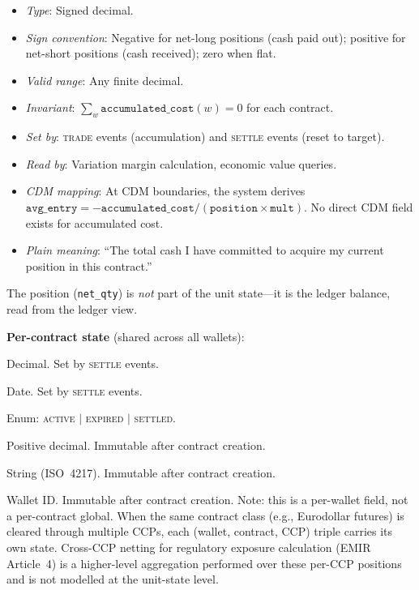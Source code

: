 \documentclass[11pt,a4paper]{article}
\begin{document}
\begin{description}[style=nextline,nosep]
\item[\texttt{accumulated\_cost}] \hfill
  \begin{itemize}[nosep]
  \item \emph{Type}: Signed decimal.
  \item \emph{Sign convention}: Negative for net-long positions (cash paid out); positive for net-short positions (cash received); zero when flat.
  \item \emph{Valid range}: Any finite decimal.
  \item \emph{Invariant}: $\sum_w \texttt{accumulated\_cost}(w) = 0$ for each contract.
  \item \emph{Set by}: \textsc{trade} events (accumulation) and \textsc{settle} events (reset to target).
  \item \emph{Read by}: Variation margin calculation, economic value queries.
  \item \emph{CDM mapping}: At CDM boundaries, the system derives $\texttt{avg\_entry} = -\texttt{accumulated\_cost} / (\texttt{position} \times \texttt{mult})$.  No direct CDM field exists for accumulated cost.
  \item \emph{Plain meaning}: ``The total cash I have committed to acquire my current position in this contract.''
  \end{itemize}
\end{description}

\noindent The position (\texttt{net\_qty}) is \emph{not} part of the unit state---it is the ledger balance, read from the ledger view.

\medskip
\noindent\textbf{Per-contract state} (shared across all wallets):

\begin{description}[style=nextline,nosep]
\item[\texttt{last\_settlement\_price}] Decimal.  Set by \textsc{settle} events.
\item[\texttt{last\_settlement\_date}] Date.  Set by \textsc{settle} events.
\item[\texttt{lifecycle\_stage}] Enum: \textsc{active} $|$ \textsc{expired} $|$ \textsc{settled}.
\item[\texttt{multiplier}] Positive decimal.  Immutable after contract creation.
\item[\texttt{currency}] String (ISO~4217).  Immutable after contract creation.
\item[\texttt{clearinghouse}] Wallet ID.  Immutable after contract creation.  Note: this is a per-wallet field, not a per-contract global.  When the same contract class (e.g., Eurodollar futures) is cleared through multiple CCPs, each (wallet, contract, CCP) triple carries its own state.  Cross-CCP netting for regulatory exposure calculation (EMIR Article~4) is a higher-level aggregation performed over these per-CCP positions and is not modelled at the unit-state level.
\end{description}
\end{document}
